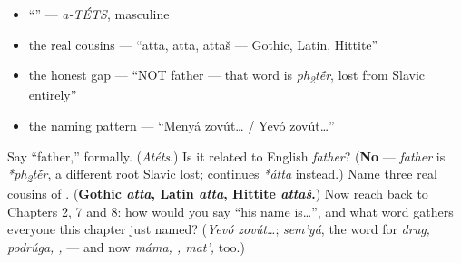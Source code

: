\begin{itemize}
\raggedright
  \item \textquotedblleft{}\textquotedblright{} — \emph{a-TÉTS}, masculine
  \item the real cousins — \textquotedblleft{}atta, atta, attaš — Gothic, Latin, Hittite\textquotedblright{}
  \item the honest gap — \textquotedblleft{}NOT father — that word is \emph{ph\textsubscript{2}t\'{\={e}}r}, lost from Slavic entirely\textquotedblright{}
  \item the naming pattern — \textquotedblleft{}Menyá zovút… / Yevó zovút…\textquotedblright{}
\end{itemize}

\begin{tcolorbox}[breakable,colback=teal!4,colframe=teal!35!black,title={Before you move on}]
Say \textquotedblleft{}father,\textquotedblright{} formally. (\emph{Atéts}.) Is it related to English \emph{father}? (\textbf{No} — \emph{father} is \emph{*ph\textsubscript{2}t\'{\={e}}r}, a different root Slavic lost; \emph{} continues \emph{*átta} instead.) Name three real cousins of \emph{}. (\textbf{Gothic \emph{atta}, Latin \emph{atta}, Hittite \emph{attaš}.}) Now reach back to Chapters 2, 7 and 8: how would you say \textquotedblleft{}his name is…\textquotedblright{}, and what word gathers everyone this chapter just named? (\emph{Yevó zovút…}; \emph{sem'yá}, the word for \emph{drug, podrúga, , } — and now \emph{máma, , mat', } too.)
\end{tcolorbox}
